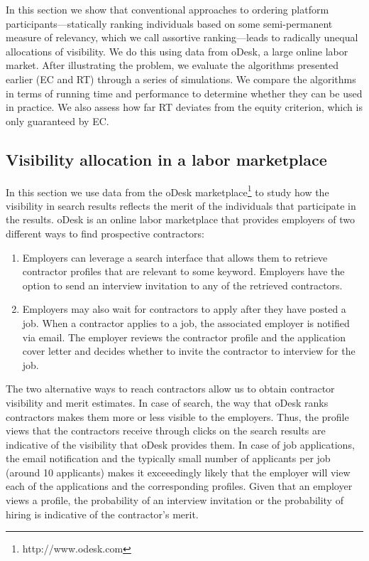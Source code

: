\documentclass[prodmode,acmec]{acmsmall}
\begin{document}
In this section we show that conventional approaches to ordering
platform participants---statically ranking individuals based on some
semi-permanent measure of relevancy, which we call assortive
ranking---leads to radically unequal allocations of visibility. We do
this using data from oDesk, a large online labor market. After
illustrating the problem, we evaluate the algorithms presented earlier
(EC and RT) through a series of simulations. We compare the algorithms
in terms of running time and performance to determine whether they can
be used in practice. We also assess how far RT deviates from the
equity criterion, which is only guaranteed by EC.

\subsection{Visibility allocation in a labor marketplace}
\label{sec:expr-odesk}

In this section we use data from the oDesk
marketplace\footnote{http://www.odesk.com} to study how the visibility
in search results reflects the merit of the individuals that
participate in the results. oDesk is an online labor marketplace that
provides employers of two different ways to find prospective
contractors:
\begin{enumerate}
\item Employers can leverage a search interface that allows them to
  retrieve contractor profiles that are relevant to some
  keyword. Employers have the option to send an interview invitation
  to any of the retrieved contractors.
\item Employers may also wait for contractors to apply after they have
  posted a job. When a contractor applies to a job, the associated
  employer is notified via email. The employer reviews the contractor
  profile and the application cover letter and decides whether to
  invite the contractor to interview for the job.
\end{enumerate}

The two alternative ways to reach contractors allow us to obtain
contractor visibility and merit estimates. In case of search, the way
that oDesk ranks contractors makes them more or less visible to the
employers. Thus, the profile views that the contractors receive
through clicks on the search results are indicative of the visibility
that oDesk provides them. In case of job applications, the email
notification and the typically small number of applicants per job
(around 10 applicants) makes it exceeedingly likely that the employer
will view each of the applications and the corresponding
profiles. Given that an employer views a profile, the probability of
an interview invitation or the probability of hiring is indicative of
the contractor's merit.
\end{document}
